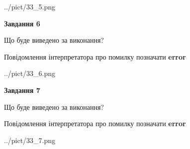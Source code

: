 \documentclass[10pt, ukrainian]{article}
\begin{document}
{\begin {large}
\begin{center}
	{../pict/33_5.png}
\end{center}
\newpage

{\begin {center}\textbf{Завдання 6}\end {center}}\par
Що буде виведено за виконання? \par
Повідомлення інтерпретатора про помилку позначати \textbf{error}

\begin{center}
	{../pict/33_6.png}
\end{center}
\newpage

{\begin {center}\textbf{Завдання 7}\end {center}}\par
Що буде виведено за виконання? \par
Повідомлення інтерпретатора про помилку позначати \textbf{error}

\begin{center}
	{../pict/33_7.png}
\end{center}
\newpage

\end {large}}
\end{document}
